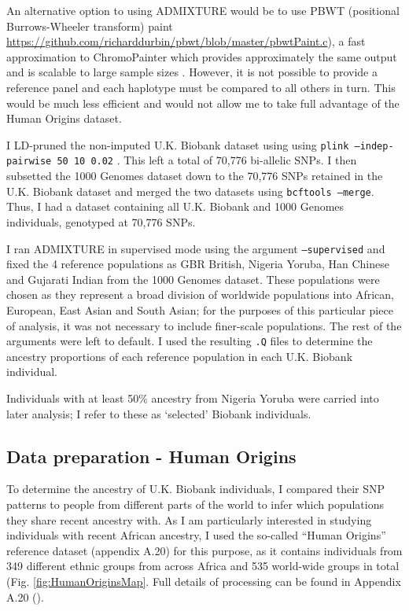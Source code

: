 An alternative option to using ADMIXTURE would be to use PBWT (positional Burrows-Wheeler transform) paint \url{https://github.com/richarddurbin/pbwt/blob/master/pbwtPaint.c}), a fast approximation to ChromoPainter which provides approximately the same output and is scalable to large sample sizes \cite{byrne2020dutch}. However, it is not possible to provide a reference panel and each haplotype must be compared to all others in turn. This would be much less efficient and would not allow me to take full advantage of the Human Origins dataset. 

I LD-pruned the non-imputed U.K. Biobank dataset using using \texttt{plink --indep-pairwise 50 10 0.02} \cite{purcell2007plink}. This left a total of 70,776 bi-allelic SNPs. I then subsetted the 1000 Genomes dataset down to the 70,776 SNPs retained in the U.K. Biobank dataset and merged the two datasets using \texttt{bcftools --merge}. Thus, I had a dataset containing all U.K. Biobank and 1000 Genomes individuals, genotyped at 70,776 SNPs.

I ran ADMIXTURE in supervised mode using the argument \texttt{--supervised} and fixed the 4 reference populations as GBR British, Nigeria Yoruba, Han Chinese and Gujarati Indian from the 1000 Genomes dataset. These populations were chosen as they represent a broad division of worldwide populations into African, European, East Asian and South Asian; for the purposes of this particular piece of analysis, it was not necessary to include finer-scale populations. The rest of the arguments were left to default. I used the resulting \texttt{.Q} files to determine the ancestry proportions of each reference population in each U.K. Biobank individual. 

Individuals with at least 50\% ancestry from Nigeria Yoruba were carried into later analysis; I refer to these as `selected' Biobank individuals.

\subsection{Data preparation - Human Origins}

To determine the ancestry of U.K. Biobank individuals, I compared their SNP patterns to people from different parts of the world to infer which populations they share recent ancestry with. As I am particularly interested in studying individuals with recent African ancestry, I used the so-called ``Human Origins'' reference dataset (appendix A.20) for this purpose, as it contains individuals from 349 different ethnic groups from across Africa and 535 world-wide groups in total (Fig. \ref{fig:HumanOriginsMap}. Full details of processing can be found in Appendix A.20 ().

